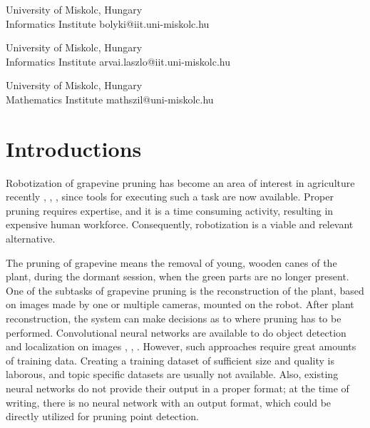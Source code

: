 \documentclass{PSAIE}%
\begin{document}
%

\fancyfoot{}

\noindent{} %

\noindent{}
{University of Miskolc, Hungary\\[0pt] Informatics Institute}
{bolyki@iit.uni-miskolc.hu}

\noindent{}
{University of Miskolc, Hungary\\[0pt] Informatics Institute}
{arvai.laszlo@iit.uni-miskolc.hu}

\noindent{}
{University of Miskolc, Hungary\\[0pt] Mathematics Institute}
{mathszil@uni-miskolc.hu}

\noindent\PSAIEreceived{\today}

\noindent{}

\noindent{}

\section{Introductions}
Robotization of grapevine pruning has become an area of interest in agriculture recently
\cite{botterill2017robot}, \cite{fernandes2021grapevine}, \cite{katyara2020reproducible}, since
tools for executing such a task are now available. Proper pruning requires expertise, and it is
a time consuming activity, resulting in expensive human workforce. Consequently, robotization is
a viable and relevant alternative.

The pruning of grapevine means the removal of young, wooden canes of the plant, during the dormant session,
when the green parts are no longer present.
One of the subtasks of grapevine pruning is the reconstruction of the plant, based on images made by
one or multiple cameras, mounted on the robot. After plant reconstruction, the system can make decisions
as to where pruning has to be performed. Convolutional neural networks are available to do
object detection and localization on images \cite{glenn_jocher_2021_5563715}, \cite{matterport_maskrcnn_2017},
\cite{liu2016ssd}. However, such approaches require great amounts of training data. Creating a training
dataset of sufficient size and quality is laborous, and topic specific datasets are usually not available.
Also, existing neural networks do not provide their output in a proper format; at the time of writing,
there is no neural network with an output format, which could be directly utilized for pruning point
detection.
\end{document}
